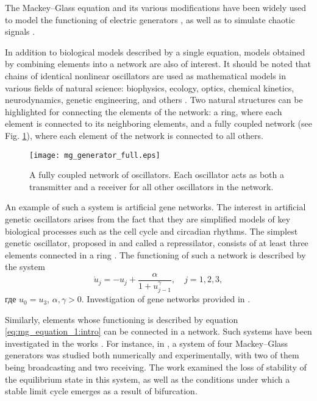 The Mackey--Glass equation and its various modifications have been widely used to model the functioning of electric generators \cite{Tateno2012, Namajunas1995, Glyzin2018, Glyzin2018a}, as well as to simulate chaotic signals \cite{Grassberger1983, Amil2015, Amil2015a, Shahverdiev2006}.

In addition to biological models described by a single equation, models obtained by combining elements into a network are also of interest. It should be noted that chains of identical nonlinear oscillators are used as mathematical models in various fields of natural science: biophysics, ecology, optics, chemical kinetics, neurodynamics, genetic engineering, and others \cite{Glyzin2022}. Two natural structures can be highlighted for connecting the elements of the network: a ring, where each element is connected to its neighboring elements, and a fully coupled network (see Fig. \ref{fig:full_mesh:intro}), where each element of the network is connected to all others.

\begin{figure}[ht]
	\centering
	\texttt{[image: mg\_generator\_full.eps]}
	\caption{A fully coupled network of oscillators. Each oscillator acts as both a transmitter and a receiver for all other oscillators in the network.}
	\label{fig:full_mesh:intro}
\end{figure}

An example of such a system is artificial gene networks. The interest in artificial genetic oscillators arises from the fact that they are simplified models of key biological processes such as the cell cycle and circadian rhythms. The simplest genetic oscillator, proposed in \cite{Elowitz2000} and called a repressilator, consists of at least three elements connected in a ring \cite{Glyzin2017, GlyzinBook2018}. The functioning of such a network is described by the system
\begin{equation}
	\label{eq:intro:repressilator}
	\dot{u}_j = -u_j + \dfrac{\alpha}{1 + u^{\gamma}_{j - 1}}, \quad j = 1, 2, 3,
\end{equation}
где $u_0 = u_3$, $\alpha, \gamma > 0$. Investigation of gene networks provided in \cite{Likhoshvaj2003, Volokitin2004, Golubyatnikov2006, Buse2009, Buse2010}.

Similarly, elements whose functioning is described by equation \eqref{eq:mg_equation_1:intro} can be connected in a network. Such systems have been investigated in the works \cite{Preobrazhenskaia2021, Tateno2012, Sano2007, Wan2009}. For instance, in \cite{Sano2007}, a system of four Mackey--Glass generators was studied both numerically and experimentally, with two of them being broadcasting and two receiving. The work \cite{Wan2009} examined the loss of stability of the equilibrium state in this system, as well as the conditions under which a stable limit cycle emerges as a result of bifurcation.

